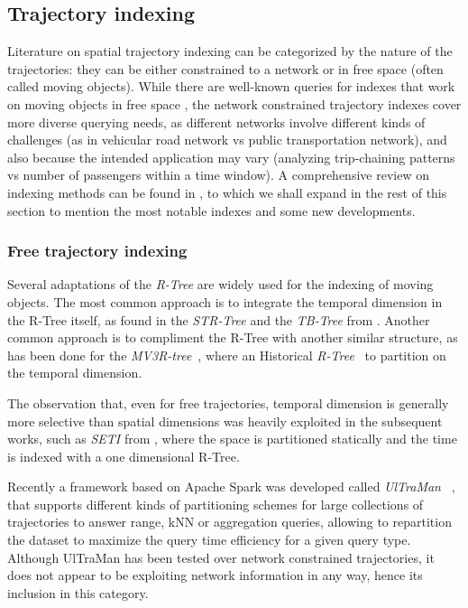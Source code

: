 \documentclass[runningheads]{llncs}
\begin{document}
\subsection{Trajectory indexing}
Literature on spatial trajectory indexing can be categorized by the nature of the trajectories: they can be either constrained to a network or in free space (often called moving objects). While there are well-known queries for indexes that work on moving objects in free space \cite{DBLP:conf/vldb/PfoserJT00}, the network constrained trajectory indexes cover more diverse querying needs, as different networks involve different kinds of challenges (as in vehicular road network vs public transportation network), and also because the intended application may vary (analyzing trip-chaining patterns vs number of passengers within a time window). A comprehensive review on indexing methods can be found in \cite[Chapter 4]{DBLP:books/sp/PelekisT14}, to which we shall expand in the rest of this section to mention the most notable indexes and some new developments.

\subsubsection{Free trajectory indexing}
Several adaptations of the {\em R-Tree} \cite{DBLP:conf/sigmod/Guttman84} are widely used for the indexing of moving objects. The most common approach is to integrate the temporal dimension in the R-Tree itself, as found in the {\em STR-Tree} and the {\em TB-Tree} from \cite{DBLP:conf/vldb/PfoserJT00}.
Another common approach is to compliment the R-Tree with another similar structure, as has been done for the {\em MV3R-tree}~\cite{DBLP:conf/vldb/PapadiasT01},
where an Historical {\em R-Tree}~\cite{nascimento1998towards} to partition on the temporal dimension.

The observation that, even for free trajectories, temporal dimension is generally more selective than spatial dimensions was heavily exploited in the subsequent works, such as {\em SETI} from \cite{chakka2003indexing}, where the space is partitioned statically and the time is indexed with a one dimensional R-Tree.

Recently a framework based on Apache Spark was developed called {\em UlTraMan}~ \cite{ding2018ultraman}, that supports different kinds of partitioning schemes for large collections of trajectories to answer range, kNN or aggregation queries, allowing to repartition the dataset to maximize the query time efficiency for a given query type. Although UlTraMan has been tested over network constrained trajectories, it does not appear to be exploiting network information in any way, hence its inclusion in this category.
\end{document}
